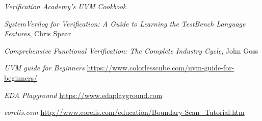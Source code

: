 \documentclass[a4paper,11pt]{article}
\begin{document}
\begin{thebibliography}{i}
 {\em Verification Academy's UVM Cookbook}

 {\em SystemVerilog for Verification: A Guide to Learning the TestBench Language Features}, Chris Spear

 {\em Comprehensive Functional Verification: The Complete Industry Cycle}, John Goss

 {\em UVM guide for Beginners}
\url{https://www.colorlesscube.com/uvm-guide-for-beginners/}

 {\em EDA Playground}
\url{https://www.edaplayground.com}

 {\em corelis.com}
\url{http://www.corelis.com/education/Boundary-Scan_Tutorial.htm}

\end{thebibliography} 
%
%
% 
 
\end{document}
